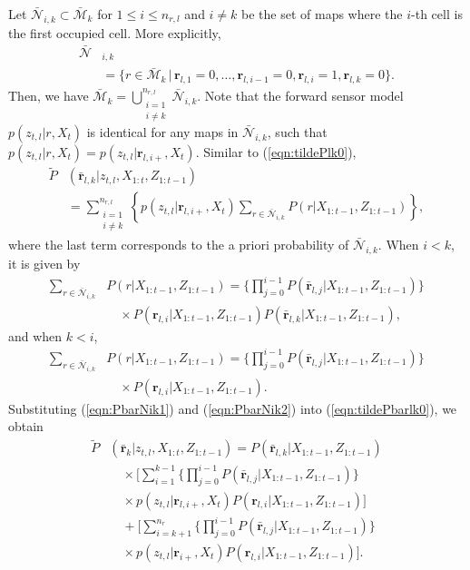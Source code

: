 \documentclass[letterpaper, 10pt, conference]{ieeeconf}
\newcommand{\braces}[1]{\ensuremath{\left\{ #1 \right\}}}
\newcommand{\refeqn}[1]{(\ref{eqn:#1})}
\begin{document}
\begin{appendix}
Let $\bar{\mathcal{N}}_{i,k}\subset \bar{\mathcal{M}}_k $ for $1\leq i\leq n_{r,l}$ and $i\neq k$ be the set of maps where the $i$-th cell is the first occupied cell. More explicitly, 
\begin{align*}
\bar{\mathcal{N}}&_{i,k}\nonumber\\&=\{r\in\bar{\mathcal{M}}_k\,|\, \mathbf{r}_{l,1}=0,\ldots,\mathbf{r}_{l,i-1}=0,
\mathbf{r}_{l,i}=1,\mathbf{r}_{l,k}=0\}.
\end{align*}
Then, we have $\bar{\mathcal{M}}_k=\bigcup_{\substack{i=1\\i\neq k}}^{n_{r,l}} \bar{\mathcal{N}}_{i,k}$. Note that the forward sensor model $p(z_{t,l}|r,X_t)$ is identical for any maps in $\bar{\mathcal{N}}_{i,k}$, such that $p(z_{t,l}|r,X_t)=p(z_{t,l}|\mathbf{r}_{l,i+},X_t)$. Similar to \refeqn{tildePlk0},
\begin{align}
\tilde P&(\bar{\mathbf{r}}_{l,k}|z_{t,l},X_{1:t},Z_{1:t-1})\nonumber\\
& = \sum_{\substack{i=1\\i\neq k}}^{n_{r,l}} \braces{p(z_{t,l}|\mathbf{r}_{l,i+},X_t) \sum_{r\in\bar{\mathcal{N}}_{i,k}} P(r|X_{1:t-1},Z_{1:t-1})},\label{eqn:tildePbarlk0}
\end{align}
where the last term corresponds to the a priori probability of $\bar{\mathcal{N}}_{i,k}$. When $i<k$, it is given by
\begin{align}
\sum_{r\in\bar{\mathcal{N}}_{i,k}} & P(r|X_{1:t-1},Z_{1:t-1}) = \bigg\{\prod_{j=0}^{i-1}P(\bar{\mathbf{r}}_{l,j}|X_{1:t-1},Z_{1:t-1})\bigg\}\nonumber\\
&\quad \times P({\mathbf{r}}_{l,i}|X_{1:t-1},Z_{1:t-1})P(\bar{\mathbf{r}}_{l,k}|X_{1:t-1},Z_{1:t-1}),\label{eqn:PbarNik1}
\end{align}
and when $k<i$,
\begin{align}
\sum_{r\in\bar{\mathcal{N}}_{i,k}} & P(r|X_{1:t-1},Z_{1:t-1}) = \bigg\{\prod_{j=0}^{i-1}P(\bar{\mathbf{r}}_{l,j}|X_{1:t-1},Z_{1:t-1})\bigg\}\nonumber\\
&\quad \times P({\mathbf{r}}_{l,i}|X_{1:t-1},Z_{1:t-1}).\label{eqn:PbarNik2}
\end{align}
Substituting \refeqn{PbarNik1} and \refeqn{PbarNik2} into \refeqn{tildePbarlk0}, we obtain
\begin{align}
\tilde P &(\bar{\mathbf{r}}_k|z_{t,l},X_{1:t},Z_{1:t-1})
=P(\bar{\mathbf{r}}_{l,k}|X_{1:t-1},Z_{1:t-1})\nonumber\\
&\quad\times \bigg[\sum_{i=1}^{k-1}\bigg\{\prod_{j=0}^{i-1}P(\bar{\mathbf{r}}_{l,j}|X_{1:t-1},Z_{1:t-1})\bigg\}\nonumber\\
&\quad\times p(z_{t,l}|\mathbf{r}_{l,i+},X_t)P(\mathbf{r}_{l,i}|X_{1:t-1},Z_{1:t-1})\bigg]
\nonumber
\\
&\quad
+
\bigg[\sum_{i=k+1}^{n_r}\bigg\{\prod_{j=0}^{i-1}P(\bar{\mathbf{r}}_{l,j}|X_{1:t-1},Z_{1:t-1})\bigg\}\nonumber\\
&\quad\times p(z_{t,l}|\mathbf{r}_{i+},X_t)P(\mathbf{r}_{l,i}|X_{1:t-1},Z_{1:t-1})\bigg].\label{eqn:tildePbar}
\end{align}





\end{appendix}
\end{document}
